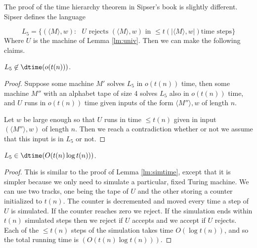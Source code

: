 \documentclass[11pt]{article}
\begin{document}
The proof of the time hierarchy theorem in Sipser's book is slightly different.
Sipser defines the language

\[
 L_5 =    \{( \langle M \rangle, w) : \mbox{ $U$ rejects $(\langle M \rangle ,w)$ in 
$\leq t(|\langle M \rangle, w|)$
time steps} \} \]
\noindent Where $U$ is the machine of Lemma \ref{lm:univ}.
Then we can make the following claims.

\begin{lemma}
$L_5 \not\in \dtime (o(t(n)))$.
\end{lemma}

\begin{proof}
Suppose some machine $M'$ solves $L_5$ in $o(t(n))$ time, then
some machine $M''$ with an alphabet tape of size 4 solves $L_5$
also in $o(t(n))$ time, and $U$ runs in $o(t(n))$ time
given inputs of the form $\langle M'' \rangle , w$ of length $n$.

Let $w$ be large enough so that $U$ runs in time $\leq t(n)$
given in input $(\langle M'' \rangle , w)$ of length $n$. 
Then we reach a contradiction whether or not we assume that
this input is in $L_5$ or not. 
\end{proof}

\begin{lemma}
$L_5 \in \dtime (O(t(n)\log t(n)))$.
\end{lemma}

\begin{proof}
This is similar to the proof of Lemma \ref{lm:simtime}, except that it is
simpler because we only need to simulate a particular, fixed Turing machine.
We can use two tracks, one being the tape of $U$ and the other storing
a counter initialized to $t(n)$. The counter is decremented and moved
every time a step of $U$ is simulated. If the counter reaches zero we reject.
If the simulation ends within $t(n)$ simulated steps then we reject if $U$
accepts and we accept if $U$ rejects. Each of the $\leq t(n)$ steps of the
simulation takes time $O(\log t(n))$, and so the total running time
is $(O(t(n)\log t(n)))$.
\end{proof}
\end{document}
